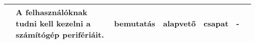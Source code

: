 \begin{tabularx}{\textwidth}{| l | X | l | l | l | l | l |}
	\azonosito                                                                                &
	A felhasználóknak tudni kell kezelni a számítógép perifériáit.                            &
	bemutatás                                                                                 &
	alapvető                                                                                  &
	csapat                                                                                    &
	-                                                                                           \\

	\hline
\end{tabularx}


